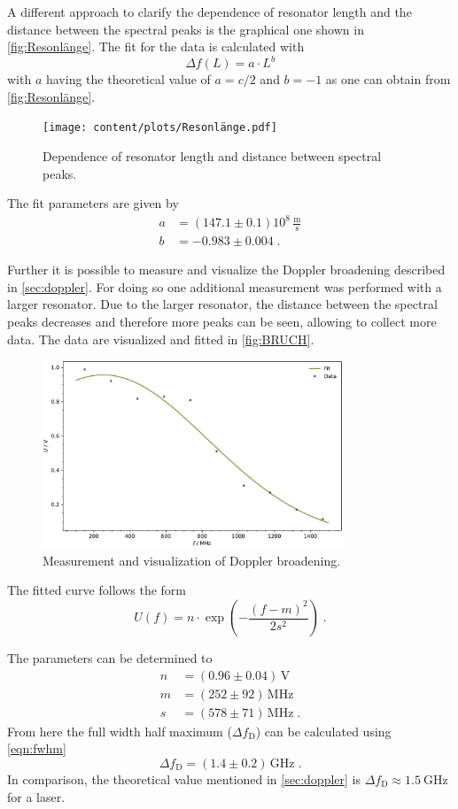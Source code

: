 A different approach to clarify the dependence of resonator length and the distance between the spectral peaks is the graphical one shown in \autoref{fig:Resonlänge}. The fit for the data is calculated with 
\begin{equation*}
    \Delta f(L)=a\cdot L^{b}
\end{equation*}
with $a$ having the theoretical value of $a=c/2$ and $b=-1$ as one can obtain from \autoref{fig:Resonlänge}.
\begin{figure}[h!]
    \centering
    \texttt{[image: content/plots/Resonlänge.pdf]}
    \caption{Dependence of resonator length and distance between spectral peaks.}
    \label{fig:Resonlänge}
\end{figure}
The fit parameters are given by 
\begin{align*}
    a&= (147.1 \pm 0.1) 10^8\, \frac{\text{m}}{\text{s}} \\
    b&= -0.983 \pm 0.004\; .
\end{align*}

Further it is possible to measure and visualize the Doppler broadening described in \autoref{sec:doppler}. For doing so one additional measurement was performed with a larger resonator. Due to the larger resonator, the distance between the spectral peaks decreases and therefore more peaks can be seen, allowing to collect more data. The data are visualized and fitted in \autoref{fig:BRUCH}.
\begin{figure}[h!]
    \centering
    \includegraphics[width=0.8\textwidth]{content/plots/AUA.pdf}
    \caption{Measurement and visualization of Doppler broadening.}
    \label{fig:BRUCH}
\end{figure}
The fitted curve follows the form 
\begin{equation*}
    U(f)= n\cdot \exp\left(-\frac{(f-m)^2}{2s^2}\right)\; .
\end{equation*}

The parameters can be determined to
\begin{align*}
    n &= (0.96 \pm 0.04)\, \text{V} \\
    m &= (252 \pm 92) \, \text{MHz} \\
    s &= (578 \pm 71) \, \text{MHz}\; .
\end{align*}
From here the full width half maximum ($\Delta f_{\text{D}}$) can be calculated using \eqref{eqn:fwhm}
\begin{equation*}
    \Delta f_{\text{D}} = (1.4 \pm 0.2) \, \text{GHz}\; . 
\end{equation*}
In comparison, the theoretical value mentioned in \autoref{sec:doppler} is $\Delta f_\text{D} \approx \qty{1.5}{\giga\hertz}$ for a \HeNe laser.
